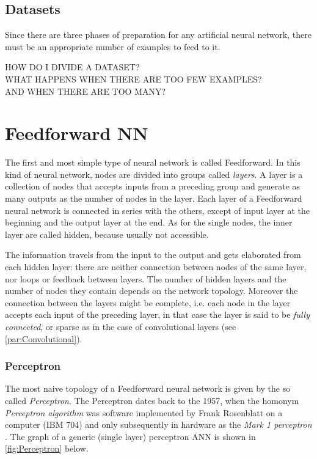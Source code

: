 \subsection{Datasets}
\label{ssec:Datasets}
Since there are three phases of preparation for any artificial neural network, there must be an appropriate number of examples to feed to it.

\noindent\uppercase{\normalsize{how do i divide a dataset?\\ what happens when there are too few examples?\\ And when there are too many?}}
\normalsize

\section{Feedforward NN}
\label{sec:Feedforward_NN}

The first and most simple type of neural network is called Feedforward.
In this kind of neural network, nodes are divided into groups called \textit{layers}.
A layer is a collection of nodes that accepts inputs from a preceding group and generate as many outputs as the number of nodes in the layer.
Each layer of a Feedforward neural network is connected in series with the others, except of input layer at the beginning and the output layer at the end.
As for the single nodes, the inner layer are called hidden, because usually not accessible.

The information travels from the input to the output and gets elaborated from each hidden layer: there are neither connection between nodes of the same layer, nor loops or feedback between layers.
The number of hidden layers and the number of nodes they contain depends on the network topology.
Moreover the connection between the layers might be complete, i.e. each node in the layer accepts each input of the preceding layer, in that case the layer is said to be \textit{fully connected}, or sparse as in the case of convolutional layers (see \autoref{par:Convolutional}).

\subsubsection{Perceptron}
\label{sssec:Perceptron}

The most naive topology of a Feedforward neural network is given by the so called \textit{Perceptron}.
The Perceptron dates back to the 1957, when the homonym \textit{Perceptron algorithm} was software implemented by Frank Rosenblatt on a computer (IBM 704) and only subsequently in hardware as the \textit{Mark 1 perceptron} \cite{frank1957perceptron,Rosenblatt1958}.
The graph of a generic (single layer) perceptron ANN is shown in \autoref{fig:Perceptron} below.

